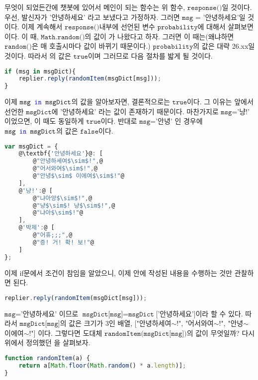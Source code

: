 \documentclass[10pt,b6paper,final]{book}
\begin{document}
무엇이 되었든간에 챗봇에 있어서 메인이 되는 함수는 위 함수, $\texttt{response()}$일 것이다. 우선, 발신자가 '안녕하세요'
라고 보냈다고 가정하자. 그러면 $\texttt{msg = '안녕하세요'}$일 것이다. 이제 계속해서 $\texttt{response()}$내부에 선언된
변수 $\texttt{probability}$에 대해서 살펴보면  이다.
이 때, $\texttt{Math.random()}$의 값이 가 나왔다고 하자. 그러면
이 때는(왜냐하면 $\texttt{random()}$은 매 호출시마다 값이 바뀌기 때문이다.) $\texttt{probability}$의 값은
대략 26.xx일 것이다. 따라서 의 값은 $\texttt{true}$이며 그러므로 다음 절차를 밟게 될 것이다.
\begin{lstlisting}[language=JavaScript,escapeinside=@@]
if (msg in msgDict){
    replier.reply(randomItem(msgDict[msg]));
}
\end{lstlisting}
이제 $\texttt{msg \textcolor{blue}{in} msgDict}$의 값을 알아보자면, 결론적으로는 $\texttt{true}$이다.
그 이유는 앞에서 선언한 $\texttt{msgDict}$에 $\texttt{'안녕하세요'}$ 라는 값이 존재하기 때문이다.
마찬가지로 $\texttt{msg}$='냥!' 이었으면, 이 때도 동일하게 $\texttt{true}$이다. 반대로 $\texttt{msg}$='안녕' 인 경우에
$\texttt{msg \textcolor{blue}{in} msgDict}$의 값은 $\texttt{false}$이다.
\begin{lstlisting}[language=JavaScript,escapeinside=@@, caption={$\texttt{msgDict}$}]
var msgDict = {
    @\textbf{'안녕하세요'}@: [
        @"안녕하세여$\sim$!",@
        @"어서와여$\sim$!",@
        @"안녕$\sim$ 이에여$\sim$!"@
    ],
    @'냥!':@ [
        @"냐아앙$\sim$!",@
        @"냥$\sim$! 냥$\sim$!",@
        @"냐아$\sim$!"@
    ],
    @'박제':@ [
        @"어휴;;;",@
        @"증! 거! 확! 보!"@
    ]
};
\end{lstlisting}
이제 if문에서 조건이 참임을 알았으니, 이제 안에 작성된 내용을 수행하는 것만 관찰하면 된다.
\begin{lstlisting}[language=JavaScript,escapeinside=@@]
replier.reply(randomItem(msgDict[msg]));
\end{lstlisting}
$\texttt{msg}$='안녕하세요' 이므로 $\texttt{msgDict[msg]}=\texttt{msgDict}$['안녕하세요']이라 할 수 있다.
따라서 $\texttt{msgDict[msg]}$의 값은 크기가 3인 배열, ["안녕하세여$\sim$!", "어서와여$\sim$!", "안녕$\sim$ 이에여$\sim$!"]
이다.
그렇다면 도대체 $\texttt{randomItem(msgDict[msg])}$의 값이 무엇일까? 다시 위에서 정의했던 을 살펴보자.
\begin{lstlisting}[language=JavaScript,escapeinside=~~, caption={$\texttt{randomItem(array)}$}]
function randomItem(a) {
    return a[Math.floor(Math.random() * a.length)];
}
\end{lstlisting}
\end{document}

